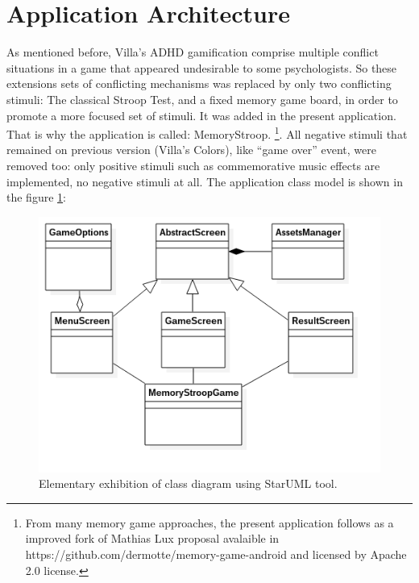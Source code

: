 		
\section{Application Architecture}

As mentioned before, Villa's ADHD gamification comprise multiple conflict situations in a game that appeared undesirable to some psychologists. So these extensions sets of conflicting mechanisms was replaced by only two conflicting stimuli: The classical Stroop Test, and a fixed memory game board, in order to promote a more focused set of stimuli. It was added in the present application. That is why the application is called: MemoryStroop. \footnote{From many memory game approaches, the present application follows as a improved fork of Mathias Lux proposal avalaible in https://github.com/dermotte/memory-game-android and licensed by Apache 2.0 license.}.  All negative stimuli that remained on previous version (Villa's Colors), like ``game over'' event, were removed too: only positive stimuli such as commemorative music effects are implemented, no negative stimuli at all. The application class model is shown in the figure \ref{uml}:
		
				\begin{figure}[htp]
					\begin{center}
						\includegraphics[scale=0.65]{chapters/desenvolvimento/img/uml_2.png}
						\caption{Elementary exhibition of class diagram using StarUML tool.}
						\label{uml}
					\end{center}
				\end{figure}
		
